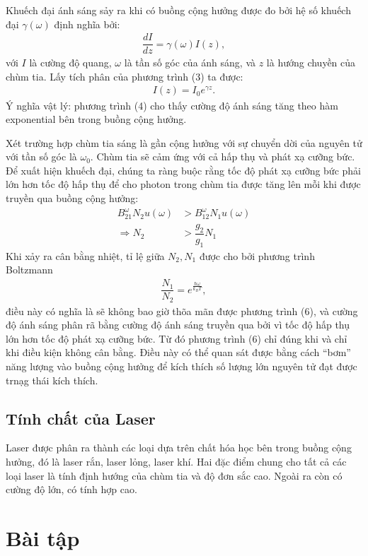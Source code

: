\documentclass{article}
\newcommand{\f}[2]{\dfrac{#1}{#2}}
\begin{document}
Khuếch đại ánh sáng sảy ra khi có buồng cộng hưởng được đo bởi hệ số khuếch đại $\gamma(\omega)$ định nghĩa bởi:
\begin{align}
	\f{d I}{d z} = \gamma(\omega) I(z),
\end{align}
với	$I$ là cường độ quang, $\omega$ là tần số góc của ánh sáng, và $z$ là hướng chuyền của chùm tia. Lấy tích phân của phương trình (3) ta được:
\begin{align}
	I(z) = I_0 e^{\gamma z}.
\end{align}
Ý nghĩa vật lý: phương trình (4) cho thấy cường độ ánh sáng tăng theo hàm exponential bên trong buồng cộng hưởng.

Xét trường hợp chùm tia sáng là gần cộng hưởng với sự chuyển dời của nguyên tử với tần số góc là $\omega_0$. Chùm tia sẽ cảm ứng với cả hấp thụ và phát xạ cưỡng bức. Để xuất hiện khuếch đại, chúng ta ràng buộc rằng tốc độ phát xạ cưỡng bức phải lớn hơn tốc độ hấp thụ để cho photon trong chùm tia được tăng lên mỗi khi được truyền qua buồng cộng hưởng:
\begin{align}
	B_{21}^{\omega} N_2 u(\omega) & > B_{12}^{\omega} N_1 u(\omega) \\
	\Rightarrow N_2               & > \f{g_2}{g_1}N_1
\end{align}
Khi xảy ra cân bằng nhiệt, tỉ lệ giữa $N_2,N_1$ được cho bởi phương trình Boltzmann
\begin{align*}
	\f{N_1}{N_2} = e^{\frac{\hbar \omega}{k_B T}},
\end{align*}
điều này có nghĩa là sẽ không bao giờ thõa mãn được phương trình (6), và cường độ ánh sáng phân rã bằng cường độ ánh sáng truyền qua bởi vì tốc độ hấp thụ	lớn hơn tốc độ phát xạ cưỡng bức. Từ đó phương trình (6) chỉ đúng khi và chỉ khi điều kiện không cân bằng. Điều này có thể quan sát được bằng cách ``bơm'' năng lượng vào buồng cộng hưởng để kích thích số lượng lớn nguyên tử đạt được trnạg thái kích thích.

\subsection{Tính chất của Laser}
Laser được phân ra thành các loại dựa trên chất hóa học bên trong buồng cộng hưởng, đó là laser rắn, laser lỏng, laser khí. Hai đặc điểm chung cho tất cả các loại laser là tính định hướng của chùm tia và độ đơn sắc cao. Ngoài ra còn có cường độ lớn, có tính hợp cao.

\section{Bài tập}
\end{document}
